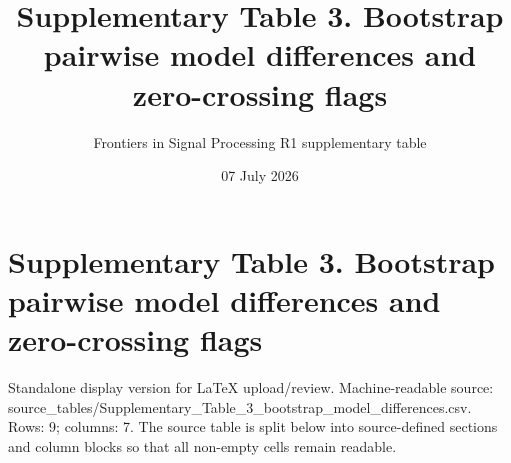 \documentclass[11pt]{article}
\title{Supplementary Table 3. Bootstrap pairwise model differences and zero-crossing flags}
\author{Frontiers in Signal Processing R1 supplementary table}
\date{07 July 2026}
\begin{document}
\maketitle

\section*{Supplementary Table 3. Bootstrap pairwise model differences and zero-crossing flags}

Standalone display version for LaTeX upload/review. Machine-readable source: source\_\allowbreak{}tables/\allowbreak{}Supplementary\_\allowbreak{}Table\_\allowbreak{}3\_\allowbreak{}bootstrap\_\allowbreak{}model\_\allowbreak{}differences.\allowbreak{}csv. Rows: 9; columns: 7. The source table is split below into source-defined sections and column blocks so that all non-empty cells remain readable.
\end{document}
